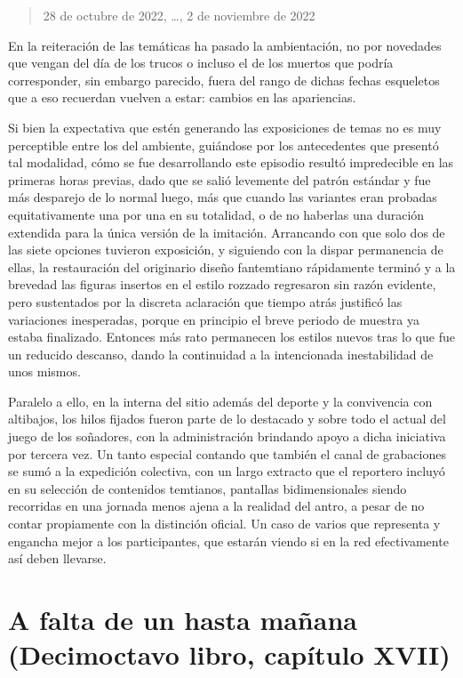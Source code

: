 \documentclass[
]{book}
\begin{document}
\begin{quote}
28 de octubre de 2022, \ldots, 2 de noviembre de 2022
\end{quote}

En la reiteración de las temáticas ha pasado la ambientación, no por novedades que vengan del día de los trucos o incluso el de los muertos que podría corresponder, sin embargo parecido, fuera del rango de dichas fechas esqueletos que a eso recuerdan vuelven a estar: cambios en las apariencias.

Si bien la expectativa que estén generando las exposiciones de temas no es muy perceptible entre los del ambiente, guiándose por los antecedentes que presentó tal modalidad, cómo se fue desarrollando este episodio resultó impredecible en las primeras horas previas, dado que se salió levemente del patrón estándar y fue más desparejo de lo normal luego, más que cuando las variantes eran probadas equitativamente una por una en su totalidad, o de no haberlas una duración extendida para la única versión de la imitación. Arrancando con que solo dos de las siete opciones tuvieron exposición, y siguiendo con la dispar permanencia de ellas, la restauración del originario diseño fantemtiano rápidamente terminó y a la brevedad las figuras insertos en el estilo rozzado regresaron sin razón evidente, pero sustentados por la discreta aclaración que tiempo atrás justificó las variaciones inesperadas, porque en principio el breve periodo de muestra ya estaba finalizado. Entonces más rato permanecen los estilos nuevos tras lo que fue un reducido descanso, dando la continuidad a la intencionada inestabilidad de unos mismos.

Paralelo a ello, en la interna del sitio además del deporte y la convivencia con altibajos, los hilos fijados fueron parte de lo destacado y sobre todo el actual del juego de los soñadores, con la administración brindando apoyo a dicha iniciativa por tercera vez. Un tanto especial contando que también el canal de grabaciones se sumó a la expedición colectiva, con un largo extracto que el reportero incluyó en su selección de contenidos temtianos, pantallas bidimensionales siendo recorridas en una jornada menos ajena a la realidad del antro, a pesar de no contar propiamente con la distinción oficial. Un caso de varios que representa y engancha mejor a los participantes, que estarán viendo si en la red efectivamente así deben llevarse.

\hypertarget{a-falta-de-un-hasta-mauxf1ana-decimoctavo-libro-capuxedtulo-xvii}{%
\section{A falta de un hasta mañana (Decimoctavo libro, capítulo XVII)}\label{a-falta-de-un-hasta-mauxf1ana-decimoctavo-libro-capuxedtulo-xvii}}
\end{document}
